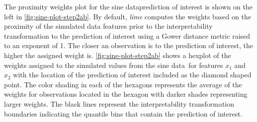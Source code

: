 \documentclass[AMS,STIX2COL]{WileyNJD-v2}\usepackage[]{graphicx}\usepackage[]{color}
\newcommand{\hh}[1]{\textcolor{orange}{#1}}
\newcommand{\kgc}[1]{\textcolor{purple}{#1}}
\newcommand{\data}{sine data}
\begin{document}
{The proximity weights plot for the \data prediction of interest is shown on the left in \autoref{fig:sine-plot-step2ab}. By default, \emph{lime} computes the weights %
based on the proximity of the simulated data features prior to the interpretability transformation to the prediction of interest using a Gower distance metric \citep{gower:1971} raised to an exponent of 1. %
The closer an observation is to the prediction of interest, the higher the assigned weight is. \autoref{fig:sine-plot-step2ab} shows a hexplot of the weights assigned to the simulated values from the \data \ for features $x_1$ and $x_2$ with the location of the prediction of interest included as the diamond shaped point. The color shading in each of the hexagons represents the average of the weights for observations located in the hexagon with darker shades representing larger weights. The black lines represent the interpretability transformation boundaries indicating the quantile bins that contain the prediction of interest.

}
\end{document}
